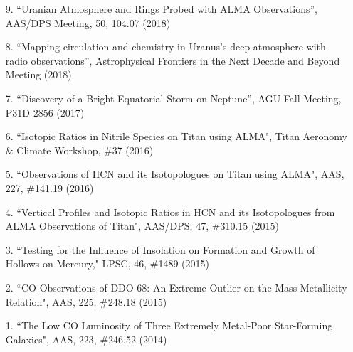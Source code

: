 \documentclass[margin, 10pt]{res} %
\begin{document}
\begin{resume}
\begin{enumerate}
\item[9.] ``Uranian Atmosphere and Rings Probed with ALMA Observations'', AAS/DPS Meeting, 50, 104.07 (2018)
\item[8.] ``Mapping circulation and chemistry in Uranus's deep atmosphere with radio observations'', Astrophysical Frontiers in the Next Decade and Beyond Meeting (2018)
\item[7.] ``Discovery of a Bright Equatorial Storm on Neptune'', AGU Fall Meeting, P31D-2856 (2017)
\item[6.] ``Isotopic Ratios in Nitrile Species on Titan using ALMA", Titan Aeronomy \& Climate Workshop, \#37 (2016)
\item[5.] ``Observations of HCN and its Isotopologues on Titan using ALMA", AAS, 227, \#141.19 (2016)
\item[4.] ``Vertical Profiles and Isotopic Ratios in HCN and its Isotopologues from ALMA Observations of Titan", AAS/DPS, 47, \#310.15 (2015)
\item[3.] ``Testing for the Influence of Insolation on Formation and Growth of Hollows on Mercury," LPSC, 46, \#1489 (2015)
\item[2.] ``CO Observations of DDO 68: An Extreme Outlier on the Mass-Metallicity Relation", AAS, 225, \#248.18 (2015)
\item[1.] ``The Low CO Luminosity of Three Extremely Metal-Poor Star-Forming Galaxies", AAS, 223, \#246.52 (2014)

\end{enumerate}



%



\end{resume}
\end{document}
